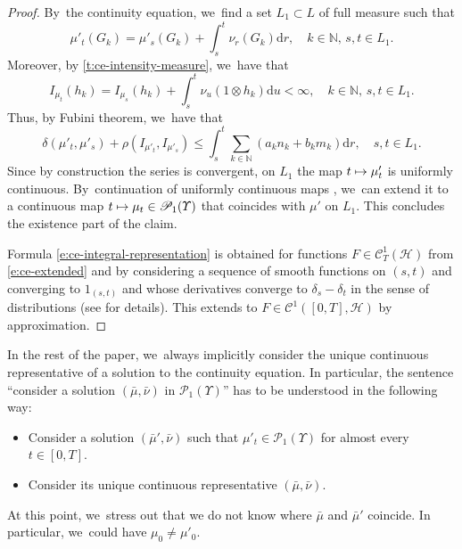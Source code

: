 \documentclass[10pt]{amsart}
\newcommand\mto{\mathchoice{\longmapsto}{\mapsto}{\mapsto}{\mapsto}}
\theoremstyle{definition}
\theoremstyle{remark}
\begin{document}
\begin{proof}
By~the continuity equation, we~find a set $L_{1} \subset L$ of full measure such that
\begin{equation*}
\mu'_{t}(G_{k}) = \mu'_{s}(G_{k}) + \int_{s}^{t} \nu_{r}(G_{k}) \mathrm{d} r, \quad k \in \mathbb{N},\, s,t \in L_{1}.
\end{equation*}
Moreover, by \cref{t:ce-intensity-measure}, we~have that
\begin{equation*}
I_{\mu_{t}}(h_{k}) = I_{\mu_{s}}(h_{k}) + \int_{s}^{t} \nu_{u}(1 \otimes h_{k}) \mathrm{d} u < \infty, \quad k \in \mathbb{N},\, s,t \in L_{1}.
\end{equation*}
Thus, by Fubini theorem, we~have that
\begin{equation*}
\delta(\mu'_{t}, \mu'_{s}) + \rho(I_{\mu'_{t}}, I_{\mu'_{s}}) \leq \int_{s}^{t} \sum_{k \in \mathbb{N}} (a_{k} n_{k} + b_{k} m_{k}) \mathrm{d} r, \quad s,t \in L_{1}.
\end{equation*}
Since by construction the series is convergent, on $L_{1}$ the map $t \mto \mu'_{t}$ is uniformly continuous.
By~continuation of uniformly continuous maps \cite[Th.\,2, p.\,II.20]{BourbakiTopo}, we~can extend it to a continuous map $t \mto \mu_{t} \in \mathscr{P}_{1}(\varUpsilon)$ that coincides with $\mu'$ on $L_{1}$.
This concludes the existence part of the claim.

Formula \cref{e:ce-integral-representation} is obtained for functions $F \in \mathscr{C}_{T}^{1}(\mathscr{H})$ from \cref{e:ce-extended} and by considering a sequence of smooth functions on $(s, t)$ and converging to $1_{(s, t)}$ and whose derivatives converge to $\delta_{s} - \delta_{t}$ in the sense of distributions (see \cite[Lem.\,3.1]{Erbar} for details).
This extends to $F \in \mathscr{C}^{1}([0,T], \mathscr{H})$ by approximation.
\end{proof}

In the rest of the paper, we~always implicitly consider the unique continuous representative of a solution to the continuity equation.
In particular, the sentence \enquote{consider a solution $(\bar{\mu}, \bar{\nu})$ in $\mathscr{P}_{1}(\varUpsilon)$} has to be understood in the following way:
\begin{itemize}[wide]
\item Consider a solution $(\bar{\mu}', \bar{\nu})$ such that $\mu'_{t} \in \mathscr{P}_{1}(\varUpsilon)$ for almost every $t \in [0,T]$.
\item Consider its unique continuous representative $(\bar{\mu}, \bar{\nu})$.
\end{itemize}
At this point, we~stress out that we do not know where $\bar{\mu}$ and $\bar{\mu}'$ coincide.
In particular, we~could have $\mu_{0} \ne \mu'_{0}$.
\end{document}

